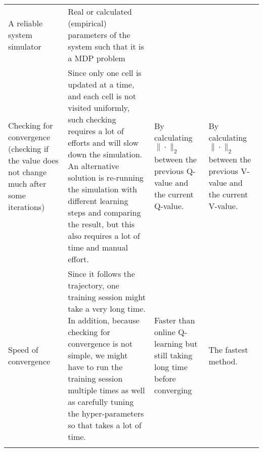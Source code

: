 \documentclass[
  a4paper, xcolor = usenames,dvipsnames]{article}
\theoremstyle{definition}
\theoremstyle{definition}
\theoremstyle{definition}
\theoremstyle{definition}
\theoremstyle{remark}
\begin{document}
\begin{longtable}[]{@{}llll@{}}
\begin{minipage}[t]{0.18\columnwidth}
A reliable system simulator\strut
\end{minipage} & \begin{minipage}[t]{0.18\columnwidth}\raggedright
Real or calculated (empirical) parameters of the system such that it is a MDP problem\strut
\end{minipage}\tabularnewline
\begin{minipage}[t]{0.18\columnwidth}\raggedright
Checking for convergence (checking if the value does not change much after some iterations)\strut
\end{minipage} & \begin{minipage}[t]{0.35\columnwidth}\raggedright
Since only one cell is updated at a time, and each cell is not visited uniformly, such checking requires a lot of efforts and will slow down the simulation. An alternative solution is re-running the simulation with different learning steps and comparing the result, but this also requires a lot of time and manual effort.\strut
\end{minipage} & \begin{minipage}[t]{0.18\columnwidth}\raggedright
By calculating \(\| \cdot \|_{2}\) between the previous Q-value and the current Q-value.\strut
\end{minipage} & \begin{minipage}[t]{0.18\columnwidth}\raggedright
By calculating \(\| \cdot \|_{2}\) between the previous V-value and the current V-value.\strut
\end{minipage}\tabularnewline
\begin{minipage}[t]{0.18\columnwidth}\raggedright
Speed of convergence\strut
\end{minipage} & \begin{minipage}[t]{0.35\columnwidth}\raggedright
Since it follows the trajectory, one training session might take a very long time. In addition, because checking for convergence is not simple, we might have to run the training session multiple times as well as carefully tuning the hyper-parameters so that takes a lot of time.\strut
\end{minipage} & \begin{minipage}[t]{0.18\columnwidth}\raggedright
Faster than online Q-learning but still taking long time before converging\strut
\end{minipage} & \begin{minipage}[t]{0.18\columnwidth}\raggedright
The fastest method.\strut
\end{minipage}\tabularnewline
\begin{minipage}[t]{0.18\columnwidth}\raggedright

\end{minipage}
\end{longtable}
\end{document}
